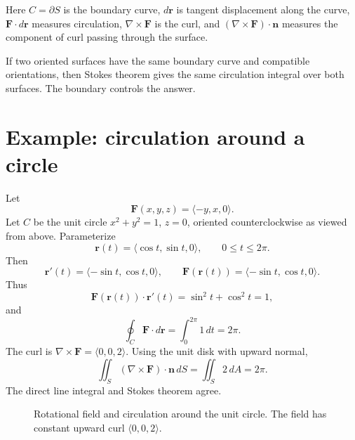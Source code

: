 \documentclass[11pt]{article}
\newcommand{\vr}{\mathbf r}
\newcommand{\vn}{\mathbf n}
\newcommand{\vF}{\mathbf F}
\begin{document}
Here $C=\partial S$ is the boundary curve, $d\vr$ is tangent displacement along the curve, $\vF\cdot d\vr$ measures circulation, $\nabla\times\vF$ is the curl, and $(\nabla\times\vF)\cdot\vn$ measures the component of curl passing through the surface.

\begin{tipbox}
If two oriented surfaces have the same boundary curve and compatible orientations, then Stokes theorem gives the same circulation integral over both surfaces. The boundary controls the answer.
\end{tipbox}

\section{Example: circulation around a circle}

\begin{examplebox}
Let
\[
\vF(x,y,z)=\langle -y,x,0\rangle.
\]
Let $C$ be the unit circle $x^2+y^2=1$, $z=0$, oriented counterclockwise as viewed from above. Parameterize
\[
\vr(t)=\langle \cos t,\sin t,0\rangle,\qquad 0\le t\le 2\pi.
\]
Then
\[
\vr'(t)=\langle -\sin t,\cos t,0\rangle,
\qquad
\vF(\vr(t))=\langle -\sin t,\cos t,0\rangle.
\]
Thus
\[
\vF(\vr(t))\cdot\vr'(t)=\sin^2t+\cos^2t=1,
\]
and
\[
\oint_C\vF\cdot d\vr=\int_0^{2\pi}1\,dt=2\pi.
\]
The curl is $\nabla\times\vF=\langle 0,0,2\rangle$. Using the unit disk with upward normal,
\[
\iint_S(\nabla\times\vF)\cdot\vn\,dS=\iint_S2\,dA=2\pi.
\]
The direct line integral and Stokes theorem agree.
\end{examplebox}

\begin{figure}[H]
\centering
{}
\caption{Rotational field and circulation around the unit circle. The field has constant upward curl $\langle0,0,2\rangle$.}
\end{figure}
\end{document}
